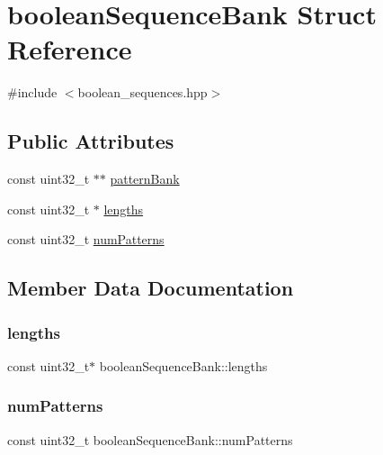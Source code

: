 \hypertarget{structboolean_sequence_bank}{}\section{boolean\+Sequence\+Bank Struct Reference}
\label{structboolean_sequence_bank}


{\ttfamily \#include $<$boolean\+\_\+sequences.\+hpp$>$}

\subsection*{Public Attributes}
\begin{DoxyCompactItemize}
\item 
const uint32\+\_\+t $\ast$$\ast$ \mbox{\hyperlink{structboolean_sequence_bank_ab4a96dcfaa6c996617b865e1be41a932}{pattern\+Bank}}
\item 
const uint32\+\_\+t $\ast$ \mbox{\hyperlink{structboolean_sequence_bank_a1236a2513ff475c974ad22d2b0b08701}{lengths}}
\item 
const uint32\+\_\+t \mbox{\hyperlink{structboolean_sequence_bank_aee27a0fab01299f5084f6fbcbbceaaf2}{num\+Patterns}}
\end{DoxyCompactItemize}


\subsection{Member Data Documentation}
\mbox{\label{structboolean_sequence_bank_a1236a2513ff475c974ad22d2b0b08701}} 
\subsubsection{\texorpdfstring{lengths}{lengths}}
{\footnotesize\ttfamily const uint32\+\_\+t$\ast$ boolean\+Sequence\+Bank\+::lengths}

\mbox{\label{structboolean_sequence_bank_aee27a0fab01299f5084f6fbcbbceaaf2}} 
\subsubsection{\texorpdfstring{num\+Patterns}{numPatterns}}
{\footnotesize\ttfamily const uint32\+\_\+t boolean\+Sequence\+Bank\+::num\+Patterns}


